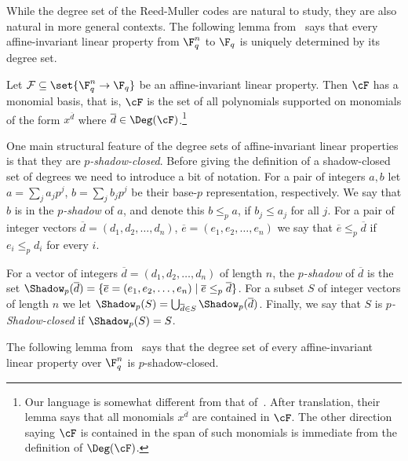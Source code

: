 While the degree set of the Reed-Muller codes are natural to study, they
are also natural in more general contexts.
The following lemma from~\cite{KS08} says that every affine-invariant linear property from $\F_q^n$ to $\F_q$ is uniquely determined by its degree set.

\begin{lemma}\label{lem:monomial-extraction}
Let $\mathcal{F} \subseteq \set{\F_{q}^n \to \F_q}$ be an affine-invariant linear property. Then $\cF$ has a monomial basis, that is, $\cF$ is the set of
all polynomials supported on monomials of the form $x^{\overline d}$ where $\overline d  \in \Deg(\cF)$.\footnote{Our language is somewhat different from that of~\cite{KS08-ECCC}. After
translation, their lemma says that all monomials $x^{\overline d}$
are contained in $\cF$. The other direction saying $\cF$ is contained
in the span of such monomials is immediate from the definition of
$\Deg(\cF)$.}
\end{lemma}

One main structural feature of the degree sets of affine-invariant linear properties is that
they are \emph{$p$-shadow-closed}. Before giving the definition of a shadow-closed set of degrees we need to introduce a bit of notation.
For a pair of integers $a,b$ let
$a= \sum_j a_j p^j$, $b= \sum_j b_jp^j$ be their base-$p$ representation, respectively. We say that $b$ is in the \emph{$p$-shadow} of $a$, and denote this $b \leq_p a$, if $b_j \leq a_j$ for all $j$.
For a pair of integer vectors $ \overline d=(d_1,d_2,\ldots,d_n)$, $\overline e=(e_1,e_2,\ldots,e_n)$ we say that
$\overline e \leq_p  \overline d$ if
$e_i \leq_p d_i$ for every $i$.

\begin{definition}\label{defn:shadow-closed}
For a vector of integers $\overline d=(d_1,d_2,\ldots,d_n)$ of length $n$, the \emph{$p$-shadow} of $\overline d$ is the set
$\Shadow_p(\overline d) = \{\overline e=(e_1,e_2,\ldots,e_n) \mid \overline e \leq_p \overline d\}$.
For a subset $S$ of integer vectors  of length $n$ we let
$\Shadow_p(S) = \bigcup_{\overline d \in S} \Shadow_p(\overline d)$.
Finally, we say that $S$ is \emph{$p$-Shadow-closed} if $\Shadow_p(S) = S$.
\end{definition}

The following lemma from~\cite{KS08-ECCC} says that the degree set of every affine-invariant linear property over $\F_q^n$ is $p$-shadow-closed.


